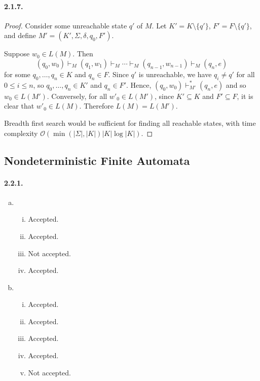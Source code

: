 \documentclass{article}
\begin{document}
\paragraph{2.1.7.}
\begin{proof}
  Consider some unreachable state $q'$ of $M$. Let $K' = K \setminus \{q'\}$,
  $F' = F \setminus \{q'\}$, and define $M' = (K', \Sigma, \delta, q_0, F')$.
  
  Suppose $w_0 \in L(M)$. Then \[
    (q_0, w_0) \vdash_M (q_1, w_1) \vdash_M \cdots \vdash_M (q_{n-1}, w_{n-1})
    \vdash_M (q_n, e)
  \] for some $q_0, \ldots, q_n \in K$ and $q_n \in F$. Since $q'$ is
  unreachable, we have $q_i \neq q'$ for all $0 \leq i \leq n$, so $q_0, \ldots,
  q_n \in K'$ and $q_n \in F'$. Hence, $(q_0, w_0) \vdash_{M'}^* (q_n, e)$ and
  so $w_0 \in L(M')$. Conversely, for all $w'_0 \in L(M')$, since $K' \subseteq
  K$ and $F' \subseteq F$, it is clear that $w'_0 \in L(M)$. Therefore $L(M) =
  L(M')$.

  Breadth first search would be sufficient for finding all reachable states,
  with time complexity $\mathcal{O}(\min(|\Sigma|, |K|)|K|\log|K|)$.
\end{proof}

\subsection{Nondeterministic Finite Automata}

\paragraph{2.2.1.}
\begin{enumerate}[(a)]
  \item \begin{enumerate}[(i)]
      \item Accepted.
      \item Accepted.
      \item Not accepted.
      \item Accepted.
    \end{enumerate}
  \item \begin{enumerate}[(i)]
      \item Accepted.
      \item Accepted.
      \item Accepted.
      \item Accepted.
      \item Not accepted.
    \end{enumerate}
\end{enumerate}
\end{document}
